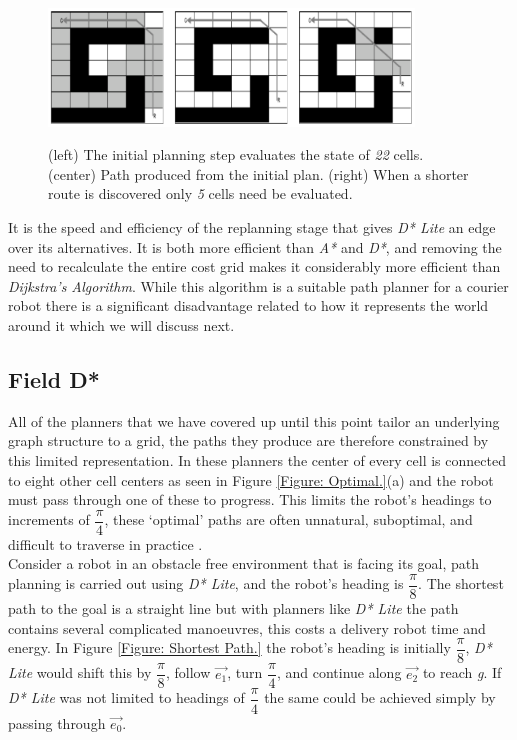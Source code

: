 \begin{figure}[htbp]

\center \includegraphics[width=275pt]{illustrations/d*_lite_path}\\
\caption{(left) The initial planning step evaluates the state of \textit{22} cells. (center) Path produced from the initial plan. (right) When a shorter route is discovered only \textit{5} cells need be evaluated.  \cite{HEURISTIC}}
\label{Figure: D* Lite Path.}

\end{figure}

\noindent
It is the speed and efficiency of the replanning stage that gives \textit{D* Lite} an edge over its alternatives. It is both more efficient than \textit{A*} and \textit{D*}, and removing the need to recalculate the entire cost grid makes it considerably more efficient than \textit{Dijkstra's Algorithm}. While this algorithm is a suitable path planner for a courier robot there is a significant disadvantage related to how it represents the world around it which we will discuss next.

\newpage

\subsection{Field D*}
\noindent
All of the planners that we have covered up until this point tailor an underlying graph structure to a grid, the paths they produce are therefore constrained by this limited representation. In these planners the center of every cell is connected to eight other cell centers as seen in Figure \ref{Figure: Optimal.}(a) and the robot must pass through one of these to progress. This limits the robot's headings to increments of $\dfrac{\pi}{4}$, these `optimal' paths are often unnatural, suboptimal, and difficult to traverse in practice \cite{FIELD}.\\ 

\noindent
Consider a robot in an obstacle free environment that is facing its goal, path planning is carried out using \textit{D* Lite}, and the robot's heading is $\dfrac{\pi}{8}$. The shortest path to the goal is a straight line but with planners like \textit{D* Lite} the path contains several complicated manoeuvres, this costs a delivery robot time and energy. In Figure \ref{Figure: Shortest Path.} the robot's heading is initially $\dfrac{\pi}{8}$, \textit{D* Lite} would shift this by $\dfrac{\pi}{8}$, follow $\overrightarrow{e_{1}}$, turn $\dfrac{\pi}{4}$, and continue along $\overrightarrow{e_{2}}$ to reach \textit{g}. If \textit{D* Lite} was not limited to headings of $\dfrac{\pi}{4}$ the same could be achieved simply by passing through $\overrightarrow{e_{0}}$.

